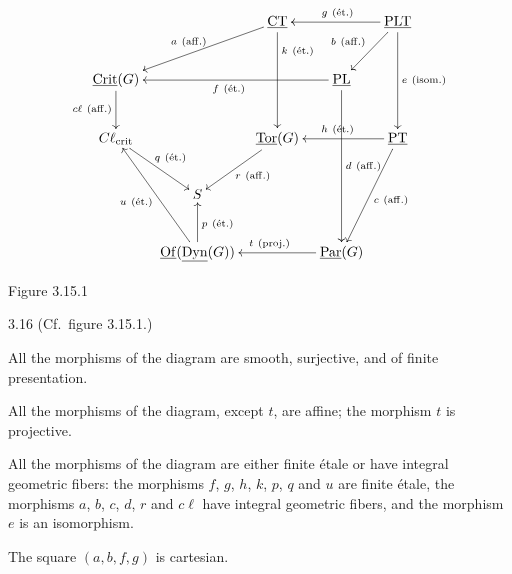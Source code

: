 \[
\xymatrix@C=9pt@R=26pt{
&&\underline{\mathrm{CT}}\ar[dll]_{a\ (\mathrm{aff.})}\ar[dd]^(.25){k\ (\mathrm{\acute et.})}&&\underline{\mathrm{PLT}}\ar[ll]_{g\ (\mathrm{\acute et.})}\ar[dl]_{b\ (\mathrm{aff.})}\ar[dd]^{e\ (\mathrm{isom.})}\\
\underline{\operatorname{Crit}}(G)\ar[d]_{c\ell\ (\mathrm{aff.})}&&&\underline{\mathrm{PL}}\ar[lll]^{f\ (\mathrm{\acute et.})}\ar[ddd]^{d\ (\mathrm{aff.})}&\\
C\ell_{\mathrm{crit}}\ar[dr]^{q\ (\mathrm{\acute et.})}&&\underline{\operatorname{Tor}}(G)\ar[dl]^{r\ (\mathrm{aff.})}&&\underline{\mathrm{PT}}\ar[ll]_{h\ (\mathrm{\acute et.})}\ar[ddl]^{c\ (\mathrm{aff.})}\\
&S&&&\\
&\underline{\operatorname{Of}}(\underline{\operatorname{Dyn}}(G))\ar[u]_{p\ (\mathrm{\acute et.})}\ar[uul]^{u\ (\mathrm{\acute et.})}&&\underline{\operatorname{Par}}(G)\ar[ll]_{t\ (\mathrm{proj.})}&
}
\]
\begin{center}Figure 3.15.1\end{center}
\begin{theorem}{3.16}\label{XXVI.3.16}
(Cf.~figure 3.15.1.)
\begin{enumeratei}
\item All the morphisms of the diagram are smooth, surjective, and of finite presentation.
\item All the morphisms of the diagram, except $t$, are affine; the morphism $t$ is projective.
\item All the morphisms of the diagram are either finite \'etale or have integral geometric fibers: the morphisms $f$, $g$, $h$, $k$, $p$, $q$ and $u$ are finite \'etale, the morphisms $a$, $b$, $c$, $d$, $r$ and $c\ell$ have integral geometric fibers, and the morphism $e$ is an isomorphism.
\item The square $(a,b,f,g)$ is cartesian.
\end{enumeratei}
\end{theorem}
